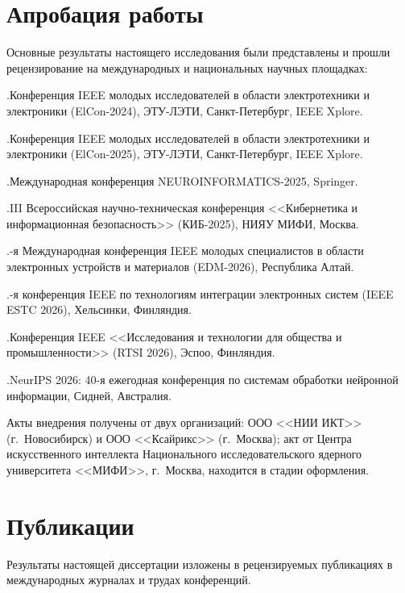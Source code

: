 \section*{Апробация работы}

Основные результаты настоящего исследования были представлены и прошли рецензирование на международных и национальных научных площадках:

.\quad Конференция IEEE молодых исследователей в области электротехники и электроники (ElCon-2024), ЭТУ-ЛЭТИ, Санкт-Петербург, IEEE Xplore.

.\quad Конференция IEEE молодых исследователей в области электротехники и электроники (ElCon-2025), ЭТУ-ЛЭТИ, Санкт-Петербург, IEEE Xplore.

.\quad Международная конференция NEUROINFORMATICS-2025, Springer.

.\quad III Всероссийская научно-техническая конференция <<Кибернетика и информационная безопасность>> (КИБ-2025), НИЯУ МИФИ, Москва.

.-я Международная конференция IEEE молодых специалистов в области электронных устройств и материалов (EDM-2026), Республика Алтай.

.-я конференция IEEE по технологиям интеграции электронных систем (IEEE ESTC 2026), Хельсинки, Финляндия.

.\quad Конференция IEEE <<Исследования и технологии для общества и промышленности>> (RTSI 2026), Эспоо, Финляндия.

.\quad NeurIPS 2026: 40-я ежегодная конференция по системам обработки нейронной информации, Сидней, Австралия.

Акты внедрения получены от двух организаций: ООО <<НИИ ИКТ>> (г.~Новосибирск) и ООО <<Ксайрикс>> (г.~Москва); акт от Центра искусственного интеллекта Национального исследовательского ядерного университета <<МИФИ>>, г.~Москва, находится в стадии оформления.

\section*{Публикации}

Результаты настоящей диссертации изложены в рецензируемых публикациях в международных журналах и трудах конференций.

